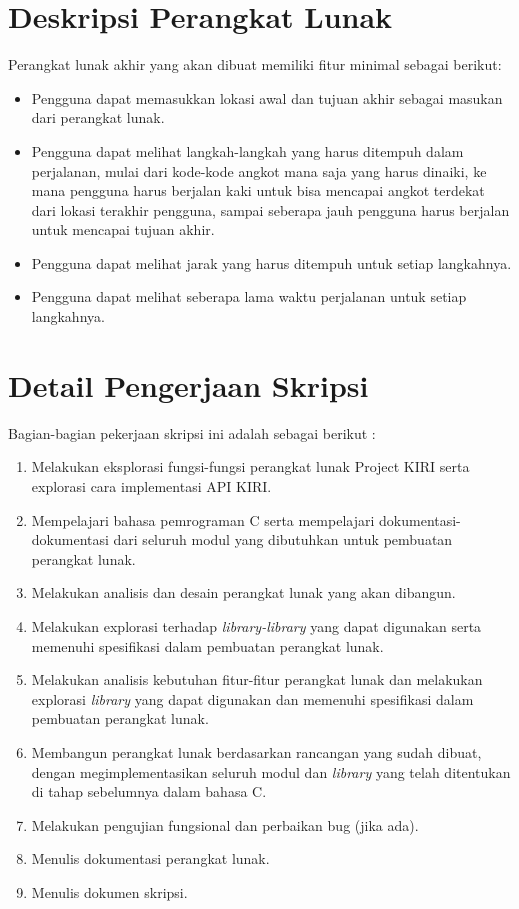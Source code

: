 \documentclass[a4paper,twoside]{article}
\begin{document}
\section{Deskripsi Perangkat Lunak}
Perangkat lunak akhir yang akan dibuat memiliki fitur minimal sebagai berikut:
\begin{itemize}
	\item Pengguna dapat memasukkan lokasi awal dan tujuan akhir sebagai masukan dari perangkat lunak.
	\item Pengguna dapat melihat langkah-langkah yang harus ditempuh dalam perjalanan, mulai dari kode-kode angkot mana saja yang harus dinaiki, ke mana pengguna harus berjalan kaki untuk bisa mencapai angkot terdekat dari lokasi terakhir pengguna, sampai seberapa jauh pengguna harus berjalan untuk mencapai tujuan akhir.
	\item Pengguna dapat melihat jarak yang harus ditempuh untuk setiap langkahnya.
	\item Pengguna dapat melihat seberapa lama waktu perjalanan untuk setiap langkahnya.
\end{itemize}

\section{Detail Pengerjaan Skripsi}
Bagian-bagian pekerjaan skripsi ini adalah sebagai berikut :
	\begin{enumerate}
		\item Melakukan eksplorasi fungsi-fungsi perangkat lunak Project KIRI serta explorasi cara implementasi API KIRI.
		\item Mempelajari bahasa pemrograman C serta mempelajari dokumentasi-dokumentasi dari seluruh modul yang dibutuhkan untuk pembuatan perangkat lunak.
		\item Melakukan analisis dan desain perangkat lunak yang akan dibangun.
	    \item Melakukan explorasi terhadap \textit{library-library} yang dapat digunakan serta memenuhi spesifikasi dalam pembuatan perangkat lunak.
		\item Melakukan analisis kebutuhan fitur-fitur perangkat lunak dan melakukan explorasi \textit{library} yang dapat digunakan dan memenuhi spesifikasi dalam pembuatan perangkat lunak.
		\item Membangun perangkat lunak berdasarkan rancangan yang sudah dibuat, dengan megimplementasikan seluruh modul dan \textit{library} yang telah ditentukan di tahap sebelumnya dalam bahasa C.
		\item Melakukan pengujian fungsional dan perbaikan bug (jika ada).
		\item Menulis dokumentasi perangkat lunak.
		\item Menulis dokumen skripsi.
	\end{enumerate}
\end{document}
